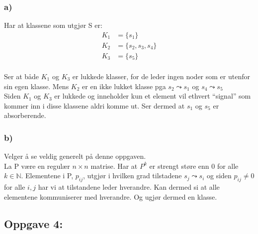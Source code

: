 \documentclass[a4paper, norsk, twoside, 10pt]{article}
\begin{document}
\begin{flushleft}


  \subsubsection*{a)}
  Har at klassene som utgjør S er:
  \begin{align*}
    K_{1} &= \{s_{1}\} \\
    K_{2} &= \{s_{2}, s_{3}, s_{4}\} \\
    K_{3} &= \{s_{5}\}\\
  \end{align*}

  Ser at både $K_{1}$ og $K_{3}$ er lukkede klasser, for de leder ingen noder som er utenfor sin egen klasse. Mens $K_{2}$ er en ikke lukket klasse pga $s_{2} \leadsto s_{1}$ og  $s_{4} \leadsto s_{5}$
  \ \\
  Siden $K_{1}$ og $K_{3}$ er lukkede og inneholder kun et element vil ethvert ``signal'' som kommer inn i disse klassene aldri komme ut. Ser dermed at $s_{1}$ og $s_{5}$ er absorberende.

  \subsubsection*{b)}

  Velger å se veldig generelt på denne oppgaven. \\
  La P være en regulær $n \times n$ matrise. Har at $P^{k}$ er strengt støre enn 0 for alle $k \in \mathbb{N}$. Elementene i P, $p_{ij}$, utgjør i hvilken grad tilstadene $s_{j} \leadsto s_{i}$ og siden  $p_{ij} \neq 0$ for alle $i,j$ har vi at tilstandene leder hverandre. Kan dermed si at alle elementene kommuniserer med hverandre. Og ugjør dermed en klasse.

  \subsection*{Oppgave 4:}


\end{flushleft}
\end{document}
